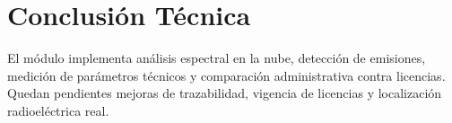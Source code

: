 \section{Conclusión Técnica}

El módulo implementa análisis espectral en la nube, detección de emisiones, medición de parámetros técnicos y comparación administrativa contra licencias. Quedan pendientes mejoras de trazabilidad, vigencia de licencias y localización radioeléctrica real. 
